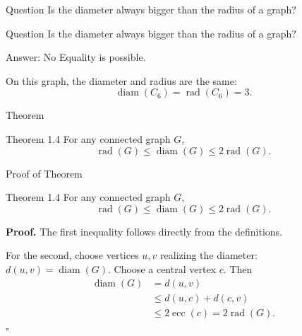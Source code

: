 \documentclass[aspectratio=169,11pt]{beamer}
\begin{document}
\begin{frame}[t]{Question}
\large
\vspace{0.25cm}
Is the diameter always bigger than the radius of a graph?
\vfill
\end{frame}

\begin{frame}[t]{Question}
\large
\vspace{0.25cm}
Is the diameter always bigger than the radius of a graph?

\vspace{0.3cm}
\begin{block}{Answer: No}
Equality is possible.
\end{block}

\vspace{0.1cm}
\begin{center}

\vspace{0.12cm}
On this graph, the diameter and radius are the same:
\[
\operatorname{diam}(C_6)=\operatorname{rad}(C_6)=3.
\]
\end{center}
\end{frame}


\begin{frame}[t]{Theorem}
\large
\vspace{0.15cm}
\begin{block}{Theorem 1.4}
For any connected graph $G$,
\[
  \operatorname{rad}(G)\leq\operatorname{diam}(G)\leq 2\operatorname{rad}(G).
\]
\end{block}
\vfill
\end{frame}

\begin{frame}[t]{Proof of Theorem}
\large
\vspace{0.15cm}
\begin{block}{Theorem 1.4}
For any connected graph $G$,
\[
  \operatorname{rad}(G)\leq\operatorname{diam}(G)\leq 2\operatorname{rad}(G).
\]
\end{block}

\vspace{0.20cm}
\textbf{Proof.}
The first inequality follows directly from the definitions.

\medskip
For the second, choose vertices $u,v$ realizing the diameter:
$d(u,v)=\operatorname{diam}(G)$. Choose a central vertex $c$.
Then
\[
\begin{aligned}
\operatorname{diam}(G)
  &= d(u,v)\\
  &\leq d(u,c)+d(c,v)\\
  &\leq 2\operatorname{ecc}(c)
   = 2\operatorname{rad}(G).
\end{aligned}
\]
\hfill$\square$
\end{frame}
\end{document}
